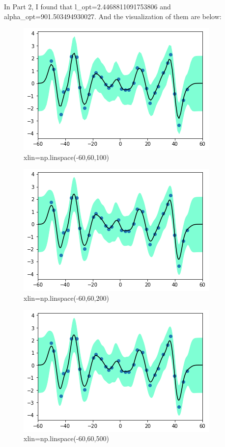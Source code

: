 \documentclass{article}
\begin{document}
\newpage

In Part 2, I found that l\_opt=2.4468811091753806 and alpha\_opt=901.503494930027. And the visualization of them are below:
\begin{figure}[h!]
\begin{center}
\includegraphics[scale=0.5]{1002.png}
\caption{xlin=np.linspace(-60,60,100)}
\end{center}
\end{figure}
\begin{figure}[h!]
\begin{center}
\includegraphics[scale=0.5]{2002.png}
\caption{xlin=np.linspace(-60,60,200)}
\end{center}
\end{figure}
\begin{figure}[h!]
\begin{center}
\includegraphics[scale=0.5]{5002.png}
\caption{xlin=np.linspace(-60,60,500)}
\end{center}
\end{figure}
\end{document}

